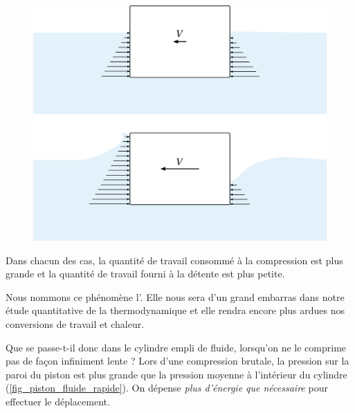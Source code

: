 		\begin{figure}[htb!]%
			\begin{center}
				\includegraphics[width=\textwidth]{images/mouvement_rapide_niveau_eau.png}
			\end{center}
			\label{fig_baignoire}
		\end{figure}
		
		Dans chacun des cas, la quantité de travail consommé à la compression est plus grande et la quantité de travail fourni à la détente est plus petite.
		
		Nous nommons ce phénomène l’. Elle nous sera d’un grand embarras dans notre étude quantitative de la thermodynamique et elle rendra encore plus ardues nos conversions de travail et chaleur.

		Que se passe-t-il donc dans le cylindre empli de fluide, lorsqu’on ne le comprime pas de façon infiniment lente ? Lors d’une compression brutale, la pression sur la paroi du piston est plus grande que la pression moyenne à l’intérieur du cylindre (\cref{fig_piston_fluide_rapide}). On dépense \emph{plus d’énergie que nécessaire} pour effectuer le déplacement.


